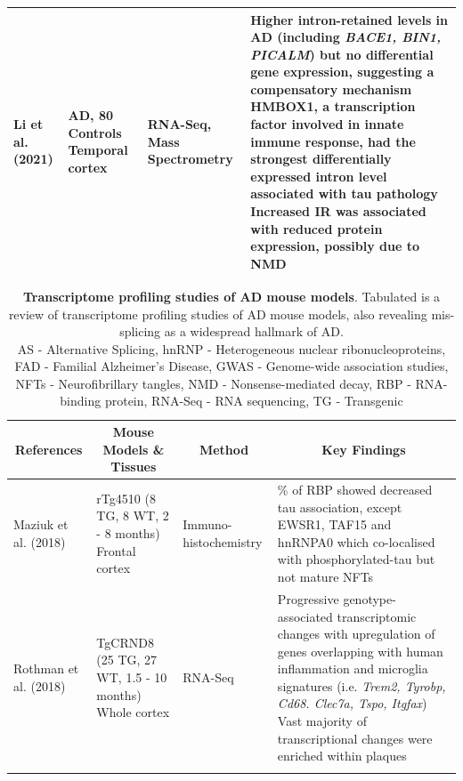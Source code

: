 \begin{landscape}
\begin{longtable}[c]{p{3cm}p{4cm}p{3cm}p{16cm}}
		\centering Li et al. (2021) \cite{Li2021} &
		\centering 84 AD, 80 Controls \newline Temporal cortex &
		\centering RNA-Seq, Mass Spectrometry &
		\tabitem Higher intron-retained levels in AD (including \textit{BACE1, BIN1, PICALM}) but no differential gene expression, suggesting a compensatory mechanism \newline
		\tabitem HMBOX1, a transcription factor involved in innate immune response, had the strongest  differentially expressed intron level associated with tau pathology \newline
		\tabitem Increased IR was associated with reduced protein expression, possibly due to NMD \\* \bottomrule
	\end{longtable}

	\clearpage
	\begin{longtable}[c]{p{3cm}p{4cm}p{3cm}p{16cm}}
		\caption[Transcriptome profiling studies of AD mouse models]%
		{\textbf{Transcriptome profiling studies of AD mouse models}. Tabulated is a review of transcriptome profiling studies of AD mouse models, also revealing mis-splicing as a widespread hallmark of AD. \newline AS - Alternative Splicing, hnRNP - Heterogeneous nuclear ribonucleoproteins, FAD - Familial Alzheimer's Disease, GWAS - Genome-wide association studies, NFTs - Neurofibrillary tangles, NMD - Nonsense-mediated decay, RBP - RNA-binding protein, RNA-Seq - RNA sequencing, TG - Transgenic}
		\label{tab: AS_ADMouse_studies}\\
		\toprule
		\multicolumn{1}{c}{References} &
		\multicolumn{1}{c}{Mouse Models \& Tissues} &
		\multicolumn{1}{c}{Method} &
		\multicolumn{1}{c}{Key Findings} \\* \midrule
		\endfirsthead			\endhead			\bottomrule			\endfoot			\endlastfoot	
		
		\centering Maziuk et al. (2018)\cite{Maziuk2018} &
		\centering rTg4510 (8 TG, 8 WT, 2 - 8 months) Frontal cortex&
		\centering Immuno-\newline histochemistry &
		\tabitem 65\% of RBP showed decreased tau association, except EWSR1, TAF15 and hnRNPA0 which co-localised with phosphorylated-tau but not mature NFTs \\
		\hdashline[0.5pt/5pt]
		
		\centering Rothman et al. (2018)\cite{Rothman2018}&
		\centering TgCRND8 (25 TG, 27 WT, 1.5 - 10 months) \newline Whole cortex&
		\centering RNA-Seq &
		\tabitem Progressive genotype-associated transcriptomic changes with upregulation of genes overlapping with human inflammation and microglia signatures (i.e. \textit{Trem2, Tyrobp, Cd68. Clec7a, Tspo, Itgfax}) \newline
		\tabitem Vast majority of transcriptional changes were enriched within plaques  \\
		\hdashline[0.5pt/5pt]
		

\end{longtable}
\end{landscape}
